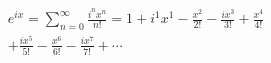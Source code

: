 \documentclass[preview]{standalone}
\begin{document}
\begin{align*}
e^{ix} = \sum_{n=0}^{\infty} \frac{i^nx^n}{n!} = 1 + i^1x^1 - \frac{x^2}{2!} - \frac{ix^3}{3!} + \frac{x^4}{4!} \\ + \frac{ix^5}{5!} - \frac{x^6}{6!} - \frac{ix^7}{7!} + \cdots
\end{align*}
\end{document}
